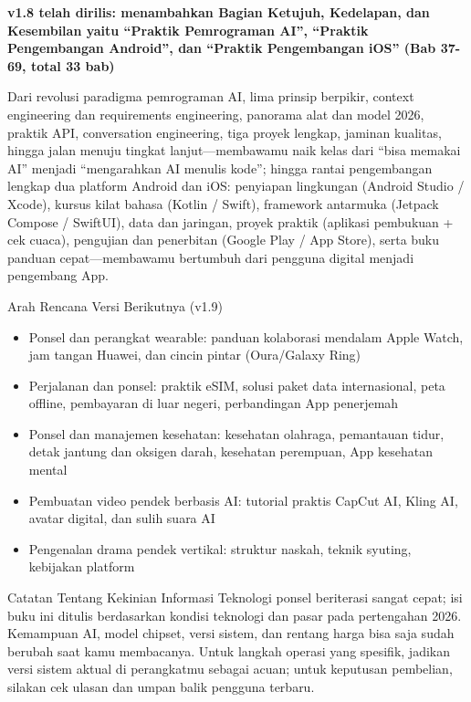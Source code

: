 

\textbf{v1.8 telah dirilis: menambahkan Bagian Ketujuh, Kedelapan, dan Kesembilan yaitu “Praktik Pemrograman AI”, “Praktik Pengembangan Android”, dan “Praktik Pengembangan iOS” (Bab 37-69, total 33 bab)}\par

Dari revolusi paradigma pemrograman AI, lima prinsip berpikir, context engineering dan requirements engineering, panorama alat dan model 2026, praktik API, conversation engineering, tiga proyek lengkap, jaminan kualitas, hingga jalan menuju tingkat lanjut—membawamu naik kelas dari “bisa memakai AI” menjadi “mengarahkan AI menulis kode”; hingga rantai pengembangan lengkap dua platform Android dan iOS: penyiapan lingkungan (Android Studio / Xcode), kursus kilat bahasa (Kotlin / Swift), framework antarmuka (Jetpack Compose / SwiftUI), data dan jaringan, proyek praktik (aplikasi pembukuan + cek cuaca), pengujian dan penerbitan (Google Play / App Store), serta buku panduan cepat—membawamu bertumbuh dari pengguna digital menjadi pengembang App.

\begin{tcbinfo}{Arah Rencana Versi Berikutnya (v1.9)}
\begin{itemize}
  \item Ponsel dan perangkat wearable: panduan kolaborasi mendalam Apple Watch, jam tangan Huawei, dan cincin pintar (Oura/Galaxy Ring)
  \item Perjalanan dan ponsel: praktik eSIM, solusi paket data internasional, peta offline, pembayaran di luar negeri, perbandingan App penerjemah
  \item Ponsel dan manajemen kesehatan: kesehatan olahraga, pemantauan tidur, detak jantung dan oksigen darah, kesehatan perempuan, App kesehatan mental
  \item Pembuatan video pendek berbasis AI: tutorial praktis CapCut AI, Kling AI, avatar digital, dan sulih suara AI
  \item Pengenalan drama pendek vertikal: struktur naskah, teknik syuting, kebijakan platform
\end{itemize}

\end{tcbinfo}

\begin{tcbwarn}{Catatan Tentang Kekinian Informasi}
Teknologi ponsel beriterasi sangat cepat; isi buku ini ditulis berdasarkan kondisi teknologi dan pasar pada pertengahan 2026. Kemampuan AI, model chipset, versi sistem, dan rentang harga bisa saja sudah berubah saat kamu membacanya. Untuk langkah operasi yang spesifik, jadikan versi sistem aktual di perangkatmu sebagai acuan; untuk keputusan pembelian, silakan cek ulasan dan umpan balik pengguna terbaru.

\end{tcbwarn}
